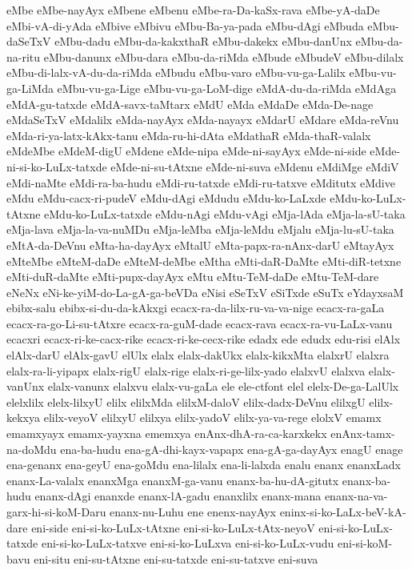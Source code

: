 {eMbe
eMbe-nayAyx
eMbene
eMbenu
eMbe-ra-Da-kaSx-rava
eMbe-yA-daDe
eMbi-vA-di-yAda
eMbive
eMbivu
eMbu-Ba-ya-pada
eMbu-dAgi
eMbuda
eMbu-daSeTxV
eMbu-dadu
eMbu-da-kakxthaR
eMbu-dakekx
eMbu-danUnx
eMbu-da-na-ritu
eMbu-danunx
eMbu-dara
eMbu-da-riMda
eMbude
eMbudeV
eMbu-dilalx
eMbu-di-lalx-vA-du-da-riMda
eMbudu
eMbu-varo
eMbu-vu-ga-Lalilx
eMbu-vu-ga-LiMda
eMbu-vu-ga-Lige
eMbu-vu-ga-LoM-dige
eMdA-du-da-riMda
eMdAga
eMdA-gu-tatxde
eMdA-savx-taMtarx
eMdU
eMda
eMdaDe
eMda-De-nage
eMdaSeTxV
eMdalilx
eMda-nayAyx
eMda-nayayx
eMdarU
eMdare
eMda-reVnu
eMda-ri-ya-latx-kAkx-tanu
eMda-ru-hi-dAta
eMdathaR
eMda-thaR-valalx
eMdeMbe
eMdeM-digU
eMdene
eMde-nipa
eMde-ni-sayAyx
eMde-ni-side
eMde-ni-si-ko-LuLx-tatxde
eMde-ni-su-tAtxne
eMde-ni-suva
eMdenu
eMdiMge
eMdiV
eMdi-naMte
eMdi-ra-ba-hudu
eMdi-ru-tatxde
eMdi-ru-tatxve
eMditutx
eMdive
eMdu
eMdu-cacx-ri-pudeV
eMdu-dAgi
eMdudu
eMdu-ko-LaLxde
eMdu-ko-LuLx-tAtxne
eMdu-ko-LuLx-tatxde
eMdu-nAgi
eMdu-vAgi
eMja-lAda
eMja-la-sU-taka
eMja-lava
eMja-la-va-nuMDu
eMja-leMba
eMja-leMdu
eMjalu
eMja-lu-sU-taka
eMtA-da-DeVnu
eMta-ha-dayAyx
eMtalU
eMta-papx-ra-nAnx-darU
eMtayAyx
eMteMbe
eMteM-daDe
eMteM-deMbe
eMtha
eMti-daR-DaMte
eMti-diR-tetxne
eMti-duR-daMte
eMti-pupx-dayAyx
eMtu
eMtu-TeM-daDe
eMtu-TeM-dare
eNeNx
eNi-ke-yiM-do-La-gA-ga-beVDa
eNisi
eSeTxV
eSiTxde
eSuTx
eYdayxsaM
ebibx-salu
ebibx-si-du-da-kAkxgi
ecacx-ra-da-lilx-ru-va-va-nige
ecacx-ra-gaLa
ecacx-ra-go-Li-su-tAtxre
ecacx-ra-guM-dade
ecacx-rava
ecacx-ra-vu-LaLx-vanu
ecacxri
ecacx-ri-ke-cacx-rike
ecacx-ri-ke-cecx-rike
edadx
ede
edudx
edu-risi
elAlx
elAlx-darU
elAlx-gavU
elUlx
elalx
elalx-dakUkx
elalx-kikxMta
elalxrU
elalxra
elalx-ra-li-yipapx
elalx-rigU
elalx-rige
elalx-ri-ge-lilx-yado
elalxvU
elalxva
elalx-vanUnx
elalx-vanunx
elalxvu
elalx-vu-gaLa
ele
ele-ctfont
elel
elelx-De-ga-LalUlx
elelxlilx
elelx-lilxyU
elilx
elilxMda
elilxM-daloV
elilx-dadx-DeVnu
elilxgU
elilx-kekxya
elilx-veyoV
elilxyU
elilxya
elilx-yadoV
elilx-ya-va-rege
elolxV
emamx
emamxyayx
emamx-yayxna
ememxya
enAnx-dhA-ra-ca-karxkekx
enAnx-tamx-na-doMdu
ena-ba-hudu
ena-gA-dhi-kayx-vapapx
ena-gA-ga-dayAyx
enagU
enage
ena-genanx
ena-geyU
ena-goMdu
ena-lilalx
ena-li-lalxda
enalu
enanx
enanxLadx
enanx-La-valalx
enanxMga
enanxM-ga-vanu
enanx-ba-hu-dA-gitutx
enanx-ba-hudu
enanx-dAgi
enanxde
enanx-lA-gadu
enanxlilx
enanx-mana
enanx-na-va-garx-hi-si-koM-Daru
enanx-nu-Luhu
ene
enenx-nayAyx
eninx-si-ko-LaLx-beV-kA-dare
eni-side
eni-si-ko-LuLx-tAtxne
eni-si-ko-LuLx-tAtx-neyoV
eni-si-ko-LuLx-tatxde
eni-si-ko-LuLx-tatxve
eni-si-ko-LuLxva
eni-si-ko-LuLx-vudu
eni-si-koM-bavu
eni-situ
eni-su-tAtxne
eni-su-tatxde
eni-su-tatxve
eni-suva
}
